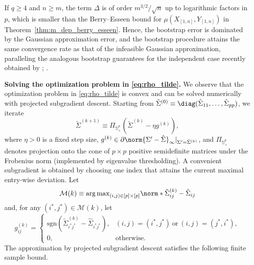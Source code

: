 \documentclass[aos]{imsart}
\begin{document}
If $q \geq 4$ and $n \geq m$, the term $\Delta$ is of order $m^{3/2} / \sqrt{n}$ up to logarithmic factors in $p$, which is  smaller than the Berry--Esseen bound for $\mu(X_{[1,n]},Y_{[1,n]})$ in Theorem~\ref{thm:m_dep_berry_esseen}. Hence, the bootstrap error is dominated by the Gaussian approximation error, and the bootstrap procedure attains the same convergence rate as that of the infeasible Gaussian approximation, paralleling the analogous bootstrap guarantees for the independent case recently obtained by \citet{lopes2020central, lopes2020bootstrapping}; .

\medskip
\textbf{Solving the optimization problem in \cref{eq:rho_tilde}. }
% 
We observe that the optimization problem in \cref{eq:rho_tilde} is convex and can be solved numerically with projected subgradient descent. Starting from $\tilde\Sigma^{(0)} \equiv \diag(\hat\Sigma_{11}, \dots, \hat\Sigma_{pp})$, we iterate
\begin{equation} \label{eq:psg_update}
    \tilde\Sigma^{(k+1)} \equiv \Pi_{\mathbb{S}_{+}^p}(\tilde\Sigma^{(k)} - \eta g^{(k)}),
\end{equation}
where $\eta > 0$ is a fixed step size, $g^{(k)} \in \partial\norm{\Sigma' - \hat\Sigma}_\infty |_{\Sigma' = \tilde\Sigma^{(k)}}$, and $\Pi_{\mathbb{S}_{+}^p}$ denotes projection onto the cone of $p \times p$ positive semidefinite matrices under the Frobenius norm (implemented by eigenvalue thresholding).  A convenient subgradient is obtained by choosing one index that attains the current maximal entry-wise deviation.  Let  
\begin{equation*}
    \mathcal{M}(k)
    \equiv {\arg\max}_{(i,j) \in [p] \times [p]} \norm*{\tilde\Sigma^{(k)}_{ij}-\hat\Sigma_{ij}}
\end{equation*}
and, for any $(i^*,j^*) \in \mathcal M(k)$, let
\begin{equation} \label{eq:subgradient}
    g^{(k)}_{ij}
    = \begin{cases}
      \mathrm{sgn}(\tilde\Sigma^{(k)}_{i^*j^*} - \hat\Sigma_{i^*j^*}),
      & (i,j)=(i^*,j^*) ~\text{or}~ (i,j)=(j^*,i^*),\\
      0, & \text{otherwise}.
    \end{cases}
\end{equation}
The approximation by projected subgradient descent satisfies the following finite sample bound. 
\end{document}
